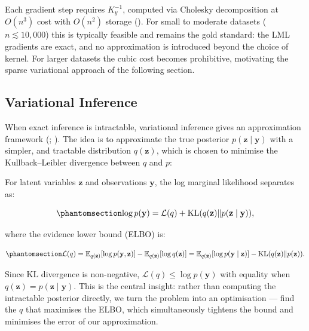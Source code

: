 \documentclass[
  letterpaper,
  DIV=11,
  numbers=noendperiod]{scrartcl}
\begin{document}
Each gradient step requires \(K_y^{-1}\), computed via Cholesky
decomposition at \(O(n^3)\) cost with \(O(n^2)\) storage
().
For small to moderate datasets (\(n \lesssim 10{,}000\)) this is
typically feasible and remains the gold standard: the LML gradients are
exact, and no approximation is introduced beyond the choice of kernel.
For larger datasets the cubic cost becomes prohibitive, motivating the
sparse variational approach of the following section.

\subsection{Variational Inference}\label{variational-inference}

When exact inference is intractable, variational inference gives an
approximation framework (; ). The idea is to approximate the true posterior
\(p(\mathbf{z} \mid \mathbf{y})\) with a simpler, and tractable
distribution \(q(\mathbf{z})\), which is chosen to minimise the
Kullback--Leibler divergence between \(q\) and \(p\):

For latent variables \(\mathbf{z}\) and observations \(\mathbf{y}\), the
log marginal likelihood separates as:

\begin{equation}\phantomsection\label{eq-vi_decomposition}{
\log p(\mathbf{y}) = \mathcal{L}(q) + \operatorname{KL}(q(\mathbf{z}) \| p(\mathbf{z} \mid \mathbf{y})),
}\end{equation}

where the evidence lower bound (ELBO) is:

\begin{equation}\phantomsection\label{eq-elbo}{
\mathcal{L}(q) = \mathbb{E}_{q(\mathbf{z})}[\log p(\mathbf{y}, \mathbf{z})] - \mathbb{E}_{q(\mathbf{z})}[\log q(\mathbf{z})] = \mathbb{E}_{q(\mathbf{z})}[\log p(\mathbf{y} \mid \mathbf{z})] - \operatorname{KL}(q(\mathbf{z}) \| p(\mathbf{z})).
}\end{equation}

Since KL divergence is non-negative,
\(\mathcal{L}(q) \leq \log p(\mathbf{y})\) with equality when
\(q(\mathbf{z}) = p(\mathbf{z} \mid \mathbf{y})\). This is the central
insight: rather than computing the intractable posterior directly, we
turn the problem into an optimisation --- find the \(q\) that maximises
the ELBO, which simultaneously tightens the bound and minimises the
error of our approximation.
\end{document}
